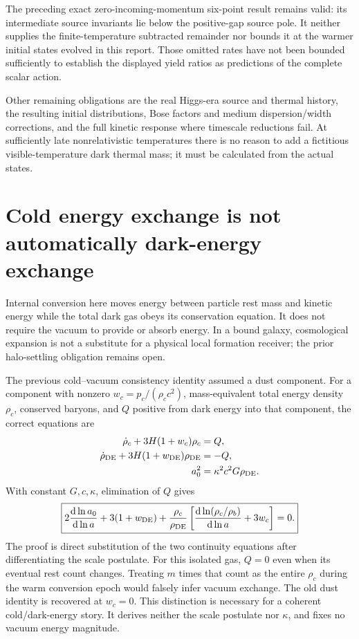 \documentclass[11pt]{article}
\newcommand{\dd}{\mathrm d}
\begin{document}
The preceding exact zero-incoming-momentum six-point result remains valid:
its intermediate source invariants lie below the positive-gap source pole.
It neither supplies the finite-temperature subtracted remainder nor bounds
it at the warmer initial states evolved in this report. Those omitted
rates have not been bounded sufficiently to establish the displayed yield
ratios as predictions of the complete scalar action.

Other remaining obligations are the real Higgs-era source and thermal
history, the resulting initial distributions, Bose factors and medium
dispersion/width corrections, and the full kinetic response where timescale
reductions fail. At sufficiently late nonrelativistic temperatures there
is no reason to add a fictitious visible-temperature dark thermal mass;
it must be calculated from the actual states.

\section{Cold energy exchange is not automatically dark-energy exchange}
Internal conversion here moves energy between particle rest mass and
kinetic energy while the total dark gas obeys its conservation equation.
It does not require the vacuum to provide or absorb energy. In a bound
galaxy, cosmological expansion is not a substitute for a physical local
formation receiver; the prior halo-settling obligation remains open.

The previous cold--vacuum consistency identity assumed a dust component.
For a component with nonzero $w_c=p_c/(\rho_cc^2)$, mass-equivalent total
energy density $\rho_c$, conserved baryons, and $Q$ positive from dark
energy into that component, the correct equations are
\begin{align}
 \dot\rho_c+3H(1+w_c)\rho_c&=Q,\\
 \dot\rho_{\rm DE}+3H(1+w_{\rm DE})\rho_{\rm DE}&=-Q,\\
 a_0^2&=\kappa^2c^2G\rho_{\rm DE}.
\end{align}
With constant $G,c,\kappa$, elimination of $Q$ gives
\begin{equation}
 \boxed{2\frac{\dd\ln a_0}{\dd\ln a}+3(1+w_{\rm DE})
 +\frac{\rho_c}{\rho_{\rm DE}}
 \left[\frac{\dd\ln(\rho_c/\rho_b)}{\dd\ln a}+3w_c\right]=0.}
\end{equation}
The proof is direct substitution of the two continuity equations after
differentiating the scale postulate. For this isolated gas, $Q=0$ even
when its eventual rest count changes. Treating $m$ times that count as
the entire $\rho_c$ during the warm conversion epoch would falsely infer
vacuum exchange. The old dust identity is recovered at $w_c=0$.
This distinction is necessary for a coherent cold/dark-energy story.
It derives neither the scale postulate nor $\kappa$, and fixes no vacuum
energy magnitude.
\end{document}
